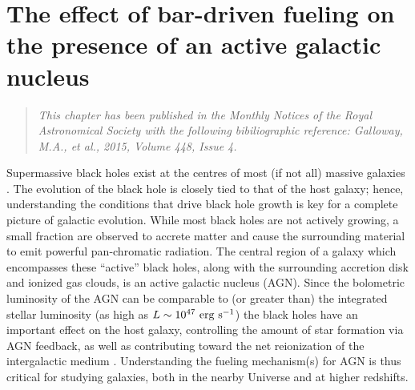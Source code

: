 
\chapter{The effect of bar-driven fueling on the presence of an active galactic nucleus}
\label{chap:baragn}

\begin{quote}
\emph{This chapter has been published in the Monthly Notices of the Royal Astronomical Society with the following bibiliographic reference:  Galloway, M.A., et al., 2015, Volume 448, Issue 4.}\\
\end{quote}

\newcommand\ioon[2]{[#1$\;${\scshape{#2}}]}      %
\newcommand\pfeatures{$p_{\rm{features~or~disk}}$}
\newcommand\pnotedgeon{$p_{\rm{not~edge-on}}$}
\newcommand\pbar{$p_{\rm{bar}}$}
\newcommand\pnobar{$p_{\rm{no~bar}}$}
\newcommand\gztwo{Galaxy~Zoo~2}
\newcommand\mbh{$M_{\rm{BH}}$}
\newcommand\db{$d_{\rm{B-NB}}$}
\newcommand\fb{$f_{\rm{B>NB}}$}
\newcommand\pasa{PASA}


Supermassive black holes exist at the centres of most (if not all) massive galaxies \citep{Kormendy1995,Richstone1998,Kormendy2001,Ghez2008}. The evolution of the black hole is closely tied to that of the host galaxy; hence, understanding the conditions that drive black hole growth is key for a complete picture of galactic evolution. While most black holes are not actively growing, a small fraction are observed to accrete matter and cause the surrounding material to emit powerful pan-chromatic radiation. The central region of a galaxy which encompasses these ``active'' black holes, along with the surrounding accretion disk and ionized gas clouds, is an active galactic nucleus (AGN). Since the bolometric luminosity of the AGN can be comparable to (or greater than) the integrated stellar luminosity (as high as $L\sim10^{47}~\rm{erg}~\rm{s}^{-1}$) the black holes have an important effect on the host galaxy, controlling the amount of star formation via AGN feedback, as well as contributing toward the net reionization of the intergalactic medium \citep{Heckman2014}. Understanding the fueling mechanism(s) for AGN is thus critical for studying galaxies, both in the nearby Universe and at higher redshifts. 

